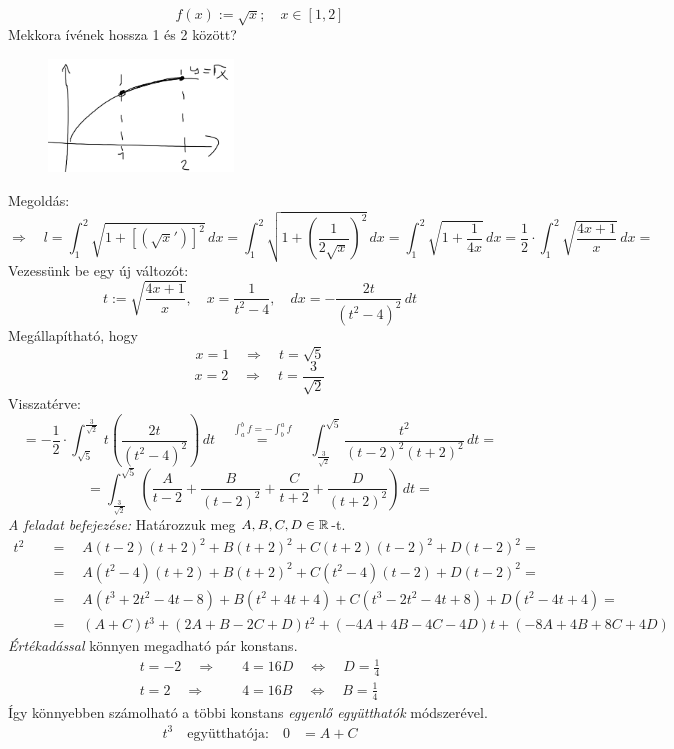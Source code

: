 \documentclass[a4paper,11.5pt]{article}
\begin{document}
	\begin{exercise}
		\[ f(x):=\sqrt{x};\quad x\in[1,2] \]
		Mekkora ívének hossza 1 és 2 között?
		\begin{figure}[H]
			\centering
			\includegraphics[height=3cm]{../2zh/kepek/12.png}
			\caption{}
		\end{figure}
		Megoldás:
		\[ \Rightarrow\quad l=\int_1^2\sqrt{1+\left[(\sqrt{x}')\right]^2}\,dx=\int_1^2\sqrt{1+\left(\frac{1}{2\sqrt{x}}\right)^2}\,dx=\int_1^2\sqrt{1+\frac{1}{4x}}\,dx=\frac{1}{2}\cdot\int_1^2\sqrt{\frac{4x+1}{x}}\,dx= \]
		Vezessünk be egy új változót:
		\[ t:=\sqrt{\frac{4x+1}{x}},\quad x=\frac{1}{t^2-4},\quad dx=-\frac{2t}{(t^2-4)^2}\,dt\]
		Megállapítható, hogy 
		\[ x=1\quad \Rightarrow\quad t=\sqrt{5} \]
		\[ x=2\quad \Rightarrow\quad t=\frac{3}{\sqrt{2}} \]
		Visszatérve:
		\[ =-\frac{1}{2}\cdot\int_{\sqrt{5}}^{\frac{3}{\sqrt{2}}}t\left(\frac{2t}{(t^2-4)^2}\right)\,dt\quad \overset{\int_a^bf=-\int_b^af}{=}\quad \int_{\frac{3}{\sqrt{2}}}^{\sqrt{5}}\frac{t^2}{(t-2)^2(t+2)^2}\,dt=\]
		\[=\int_{\frac{3}{\sqrt{2}}}^{\sqrt{5}}\left(\frac{A}{t-2}+\frac{B}{(t-2)^2}+\frac{C}{t+2}+\frac{D}{(t+2)^2}\right)\,dt=\]
		\textit{A feladat befejezése:} Határozzuk meg $A,B,C,D\in\mathbb{R}$-t.
		\begin{align*}
			t^2\quad &=\quad A(t-2)(t+2)^2+B(t+2)^2+C(t+2)(t-2)^2+D(t-2)^2=\\
					 &=\quad A(t^2-4)(t+2)+B(t+2)^2+C(t^2-4)(t-2)+D(t-2)^2=\\
					 &=\quad A(t^3+2t^2-4t-8)+B(t^2+4t+4)+C(t^3-2t^2-4t+8)+D(t^2-4t+4)=\\
					 &=\quad (A+C)t^3+(2A+B-2C+D)t^2+(-4A+4B-4C-4D)t+(-8A+4B+8C+4D)
		\end{align*}
		\textit{Értékadással} könnyen megadható pár konstans.
		\begin{align*}
		t=-2\quad \Rightarrow&\quad 4=16D\quad \Leftrightarrow\quad D=\frac{1}{4}\\
		t=2\quad \Rightarrow &\quad 4=16B\quad \Leftrightarrow\quad B=\frac{1}{4}
		\end{align*}
		Így könnyebben számolható a többi konstans \textit{egyenlő együtthatók} módszerével.
		\begin{align*}
			t^3 \quad \text{együtthatója:}\quad 0&=A+C\\

\end{align*}
\end{exercise}
\end{document}

